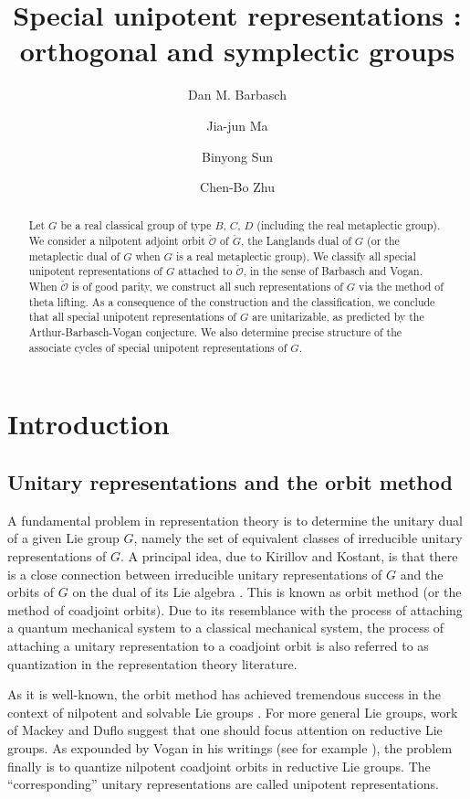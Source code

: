 \documentclass[12pt,a4paper]{amsart}
\title[]{Special unipotent representations : orthogonal and symplectic groups}
\author [D. Barbasch] {Dan M. Barbasch}
\author [J.-J. Ma] {Jia-jun Ma}
\author [B. Sun] {Binyong Sun}
\author [C.-B. Zhu] {Chen-Bo Zhu}
\newcommand{\CO}{{\mathcal {O}}}
\numberwithin{equation}{section}
\theoremstyle{remark}
\begin{document}

\begin{abstract} Let $G$ be a real classical group of type $B$, $C$, $D$ (including the real metaplectic group). We consider a nilpotent adjoint orbit $\check \CO$ of $\check G$, the Langlands dual of $G$ (or the metaplectic dual of $G$ when $G$ is a real metaplectic group). We classify all special unipotent representations of $G$ attached to $\check \CO$, in the sense of Barbasch and Vogan. When $\check \CO$ is of good parity, we construct all such representations of $G$ via the method of theta lifting. As a consequence of the construction and the classification, we conclude that all special unipotent representations of $G$ are unitarizable, as predicted by the Arthur-Barbasch-Vogan conjecture. We also determine precise structure of the associate cycles of special unipotent representations of $G$.
\end{abstract}



\maketitle


\tableofcontents


\section{Introduction}\label{sec:intro}


\subsection{Unitary representations and the orbit method}
A fundamental problem in representation theory is to determine the unitary dual
of a given Lie group $G$, namely the set of equivalent classes of irreducible
unitary representations of $G$. A principal idea, due to Kirillov and Kostant,
is that there is a close connection between irreducible unitary representations
of $G$ and the orbits of $G$ on the dual of its Lie algebra \cite{Ki62,Ko70}.
This is known as orbit method (or the method of coadjoint orbits). Due to its
resemblance with the process of attaching a quantum mechanical system to a
classical mechanical system, the process of attaching a unitary representation
to a coadjoint orbit is also referred to as quantization in the representation
theory literature.

As it is well-known, the orbit method has achieved tremendous success in the
context of nilpotent and solvable Lie groups \cite{Ki62,AK}. For more general
Lie groups, work of Mackey and Duflo \cite{Ma,Du82} suggest that one should
focus attention on reductive Lie groups. As expounded by Vogan in his writings
(see for example \cite{VoBook,Vo98,Vo00}), the problem finally is to quantize
nilpotent coadjoint orbits in reductive Lie groups. The ``corresponding''
unitary representations are called unipotent representations.
\end{document}
